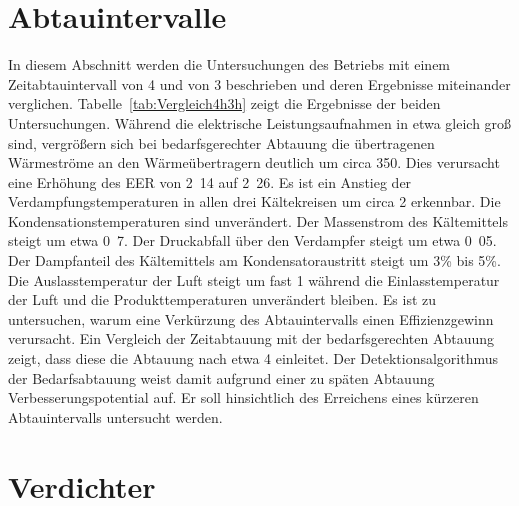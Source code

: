 \section{Abtauintervalle}
\label{sec:Abtauintervalle}

In diesem Abschnitt werden die Untersuchungen des Betriebs mit einem Zeitabtauintervall von \unit{4}{\hour} und von \unit{3}{\hour} beschrieben und deren Ergebnisse miteinander verglichen. 
Tabelle~\ref{tab:Vergleich4h3h} zeigt die Ergebnisse der beiden Untersuchungen.
Während die elektrische Leistungsaufnahmen in etwa gleich groß sind, vergrößern sich bei bedarfsgerechter Abtauung die übertragenen Wärmeströme an den Wärmeübertragern deutlich um circa \unit{350}{\watt}. Dies verursacht eine Erhöhung des EER von \unit{2.14}{} auf \unit{2.26}{}.
Es ist ein Anstieg der Verdampfungstemperaturen in allen drei Kältekreisen um circa \unit{2}{\kelvin} erkennbar. Die Kondensationstemperaturen sind unverändert. Der Massenstrom des Kältemittels steigt um etwa \unit{0.7}{\gram\per\second}. Der Druckabfall über den Verdampfer steigt um etwa \unit{0.05}{\bbar}. Der Dampfanteil des Kältemittels am Kondensatoraustritt steigt um \unit{3}{\%} bis \unit{5}{\%}. Die Auslasstemperatur der Luft steigt um fast \unit{1}{\kelvin} während die Einlasstemperatur der Luft und die Produkttemperaturen unverändert bleiben. \newline
Es ist zu untersuchen, warum eine Verkürzung des Abtauintervalls einen Effizienzgewinn verursacht. \newline
Ein Vergleich der Zeitabtauung mit der bedarfsgerechten Abtauung zeigt, dass diese die Abtauung nach etwa \unit{4}{\hour} einleitet. Der Detektionsalgorithmus der Bedarfsabtauung weist damit aufgrund einer zu späten Abtauung Verbesserungspotential auf. Er soll hinsichtlich des Erreichens eines kürzeren Abtauintervalls untersucht werden.

 











\clearpage



\section{Verdichter}
\label{sec:Verdichter}


